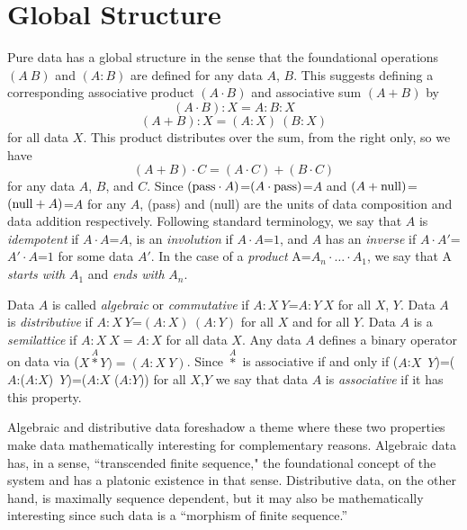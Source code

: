 \documentclass[11pt]{article}
\begin{document}
\section{Global Structure} 

    Pure data has a global structure in the sense that the foundational operations $(A\ B)$ and $(A:B)$ are defined for any data $A$, $B$.  
This suggests defining a corresponding associative product $(A\cdot B)$ and associative sum $(A+B)$ by    
\begin{equation}
(A \cdot B):X = A:B:X 
\end{equation}
\begin{equation}
(A+B):X = (A:X)\ (B:X) 
\end{equation}
for all data $X$. This product distributes over the sum, from the right only, so we have 
\begin{equation}
(A+B)\cdot C=(A\cdot C)+(B\cdot C) 
\end{equation}
for any data $A$, $B$, and $C$.
Since $({\rm pass}\cdot A)$=$(A\cdot {\rm pass})$=$A$ and $(A+{\rm null})$=$({\rm null}+A)$=$A$ for any $A$, (pass) and (null) are the units of data composition and 
data addition respectively.  
Following standard terminology, we say that $A$ is {\it idempotent} if $A\cdot A$=$A$, is an {\it involution} if $A\cdot A$=$1$, and $A$ has an {\it inverse} if $A\cdot A'$=$A'\cdot A$=$1$ for some data $A'$.   
In the case of a {\it product}  A=$A_n\cdot\dots\cdot A_1$, we say that A {\it starts with} $A_1$ and {\it ends with} $A_n$.   

Data $A$ is called {\it algebraic} or {\it commutative} if $A:X\ Y$=$A:Y\ X$ for all $X$, $Y$.  Data $A$ is 
{\it distributive} if $A:X\ Y$=$(A:X)\ (A:Y)$ for all $X$ and for all $Y$.  Data $A$ is a {\it semilattice} if $A:X\ X=A:X$ for all data $X$.  
Any data $A$ defines a binary operator on data via ($X{\overset A\ast}Y)=(A:X\ Y)$.  Since ${\overset A\ast}$ is associative if and only if 
 ($A$:$X$\ $Y$)=($A$:($A$:$X$)\ $Y$)=($A$:$X$ ($A$:$Y$)) for all $X$,$Y$ we say that data $A$ is {\it associative} if it has this property.  
 
Algebraic and distributive data foreshadow a theme where these two properties make data mathematically interesting for complementary reasons.  
Algebraic data has, in a sense, ``transcended finite sequence," the foundational concept of the system and has a platonic existence in 
that sense.  Distributive data, on the other hand, is maximally sequence dependent, but it may also be mathematically interesting since 
such data is a ``morphism of finite sequence.''   
 
\end{document}
